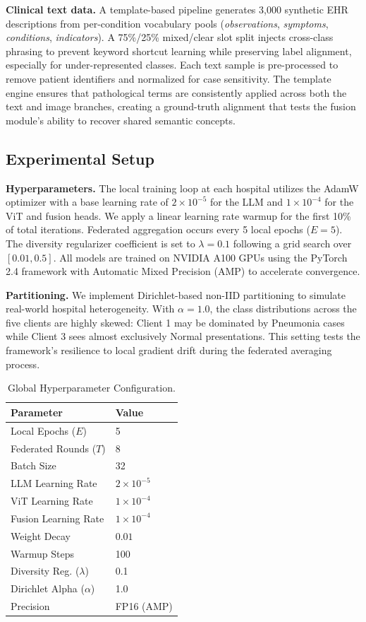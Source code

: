 \documentclass[conference]{IEEEtran}
\begin{document}
\textbf{Clinical text data.}
A template-based pipeline generates 3{,}000 synthetic EHR descriptions
from per-condition vocabulary pools (\textit{observations},
\textit{symptoms}, \textit{conditions}, \textit{indicators}). A
75\%/25\% mixed/clear slot split injects cross-class phrasing to
prevent keyword shortcut learning while preserving label alignment,
especially for under-represented classes. 
Each text sample is pre-processed to remove patient identifiers and 
normalized for case sensitivity. The template engine ensures that 
pathological terms are consistently applied across both the text 
and image branches, creating a ground-truth alignment that tests 
the fusion module's ability to recover shared semantic concepts.

\subsection{Experimental Setup}
\textbf{Hyperparameters.}
The local training loop at each hospital utilizes the AdamW optimizer 
with a base learning rate of $2{\times}10^{-5}$ for the LLM and 
$1{\times}10^{-4}$ for the ViT and fusion heads. We apply a linear 
learning rate warmup for the first 10\% of total iterations. 
Federated aggregation occurs every 5 local epochs ($E=5$). 
The diversity regularizer coefficient is set to $\lambda=0.1$ 
following a grid search over $[0.01, 0.5]$. All models are trained 
on NVIDIA A100 GPUs using the PyTorch 2.4 framework with 
Automatic Mixed Precision (AMP) to accelerate convergence.

\textbf{Partitioning.}
We implement Dirichlet-based non-IID partitioning to simulate real-world 
hospital heterogeneity. With $\alpha=1.0$, the class distributions 
across the five clients are highly skewed: Client 1 may be dominated 
by Pneumonia cases while Client 3 sees almost exclusively 
Normal presentations. This setting tests the framework's resilience 
to local gradient drift during the federated averaging process.

\begin{table}[t]
\caption{Global Hyperparameter Configuration.}
\label{tab:hyper}
\centering\footnotesize
\begin{tabular}{ll}
\toprule
\textbf{Parameter} & \textbf{Value} \\
\midrule
Local Epochs ($E$) & 5 \\
Federated Rounds ($T$) & 8 \\
Batch Size & 32 \\
LLM Learning Rate & $2 \times 10^{-5}$ \\
ViT Learning Rate & $1 \times 10^{-4}$ \\
Fusion Learning Rate & $1 \times 10^{-4}$ \\
Weight Decay & $0.01$ \\
Warmup Steps & 100 \\
Diversity Reg. ($\lambda$) & 0.1 \\
Dirichlet Alpha ($\alpha$) & 1.0 \\
Precision & FP16 (AMP) \\
\bottomrule
\end{tabular}
\end{table}
\end{document}

